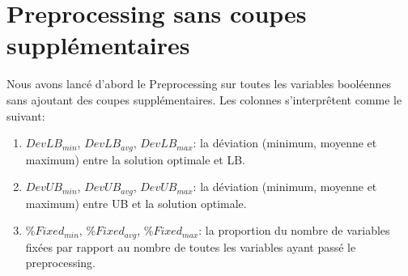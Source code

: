 \documentclass[twoside,fleqn]{EPURapport}
\begin{document}
\section{Preprocessing sans coupes supplémentaires}
Nous avons lancé d'abord le Preprocessing sur toutes les variables booléennes sans ajoutant des coupes supplémentaires.
Les colonnes s'interprêtent comme le suivant:
\begin{enumerate}
	\item $DevLB_{min}$, $DevLB_{avg}$, $DevLB_{max}$: la déviation (minimum, moyenne et maximum) entre la solution optimale et LB.
	\item $DevUB_{min}$, $DevUB_{avg}$, $DevUB_{max}$: la déviation (minimum, moyenne et maximum) entre UB et la solution optimale.
	\item $\%Fixed_{min}$, $\%Fixed_{avg}$, $\%Fixed_{max}$: la proportion du nombre de variables fixées par rapport au nombre de toutes les variables ayant passé le preprocessing.
\end{enumerate}

\end{document}
